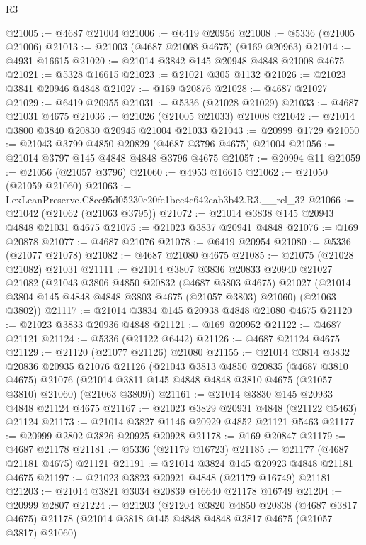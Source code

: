 \begin{lexlean}{R3}
\begin{coremodule}
@21005 := @4687 @21004
@21006 := @6419 @20956
@21008 := @5336 (@21005 @21006)
@21013 := @21003 (@4687 @21008 @4675) (@169 @20963)
@21014 := @4931 @16615
@21020 := @21014 @3842 @145 @20948 @4848 @21008 @4675
@21021 := @5328 @16615
@21023 := @21021 @305 @1132
@21026 := @21023 @3841 @20946 @4848
@21027 := @169 @20876
@21028 := @4687 @21027
@21029 := @6419 @20955
@21031 := @5336 (@21028 @21029)
@21033 := @4687 @21031 @4675
@21036 := @21026 (@21005 @21033) @21008
@21042 := @21014 @3800 @3840 @20830 @20945 @21004 @21033
@21043 := @20999 @1729
@21050 := @21043 @3799 @4850 @20829 (@4687 @3796 @4675) @21004
@21056 := @21014 @3797 @145 @4848 @4848 @3796 @4675
@21057 := @20994 @11
@21059 := @21056 (@21057 @3796)
@21060 := @4953 @16615
@21062 := @21050 (@21059 @21060)
@21063 := LexLeanPreserve.C8ce95d05230c20fe1bec4c642eab3b42.R3.__rel_32
@21066 := @21042 (@21062 (@21063 @3795))
@21072 := @21014 @3838 @145 @20943 @4848 @21031 @4675
@21075 := @21023 @3837 @20941 @4848
@21076 := @169 @20878
@21077 := @4687 @21076
@21078 := @6419 @20954
@21080 := @5336 (@21077 @21078)
@21082 := @4687 @21080 @4675
@21085 := @21075 (@21028 @21082) @21031
@21111 := @21014
    @3807
    @3836
    @20833
    @20940
    @21027
    @21082
    (@21043
      @3806
      @4850
      @20832
      (@4687 @3803 @4675)
      @21027
      (@21014 @3804 @145 @4848 @4848 @3803 @4675 (@21057 @3803) @21060)
      (@21063 @3802))
@21117 := @21014 @3834 @145 @20938 @4848 @21080 @4675
@21120 := @21023 @3833 @20936 @4848
@21121 := @169 @20952
@21122 := @4687 @21121
@21124 := @5336 (@21122 @6442)
@21126 := @4687 @21124 @4675
@21129 := @21120 (@21077 @21126) @21080
@21155 := @21014
    @3814
    @3832
    @20836
    @20935
    @21076
    @21126
    (@21043
      @3813
      @4850
      @20835
      (@4687 @3810 @4675)
      @21076
      (@21014 @3811 @145 @4848 @4848 @3810 @4675 (@21057 @3810) @21060)
      (@21063 @3809))
@21161 := @21014 @3830 @145 @20933 @4848 @21124 @4675
@21167 := @21023 @3829 @20931 @4848 (@21122 @5463) @21124
@21173 := @21014 @3827 @1146 @20929 @4852 @21121 @5463
@21177 := @20999 @2802 @3826 @20925 @20928
@21178 := @169 @20847
@21179 := @4687 @21178
@21181 := @5336 (@21179 @16723)
@21185 := @21177 (@4687 @21181 @4675) @21121
@21191 := @21014 @3824 @145 @20923 @4848 @21181 @4675
@21197 := @21023 @3823 @20921 @4848 (@21179 @16749) @21181
@21203 := @21014 @3821 @3034 @20839 @16640 @21178 @16749
@21204 := @20999 @2807
@21224 := @21203
    (@21204
      @3820
      @4850
      @20838
      (@4687 @3817 @4675)
      @21178
      (@21014 @3818 @145 @4848 @4848 @3817 @4675 (@21057 @3817) @21060)

\end{coremodule}
\end{lexlean}

